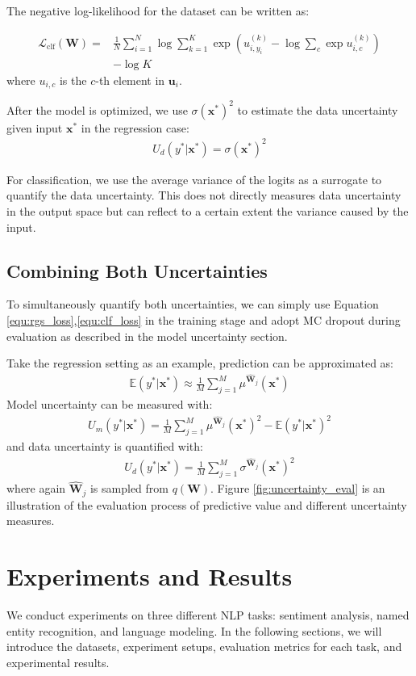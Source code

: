 \documentclass[letterpaper]{article} %
\newcommand{\vect}[1]{\mathbf{#1}}
\newcommand{\matr}[1]{\mathbf{#1}}
\newcommand{\vu}[0]{\vect{u}}
\newcommand{\vx}[0]{\vect{x}}
\newcommand{\vlb}{\mathcal{L}}
\newcommand{\E}{\mathbb{E}}
\newcommand{\mW}[0]{\matr{W}}
\begin{document}
The negative log-likelihood for the dataset can be written as:

\begin{align}
\label{equ:clf_loss}
\vlb_{\text{clf}}(\mW)= &\frac{1}{N}\sum_{i=1}^N\log\sum_{k=1}^K\exp\left(u_{i,y_i}^{(k)}-\log\sum_c\exp{u_{i,c}^{(k)}}\right) \nonumber\\
 & - \log{K}
\end{align}
where $u_{i,c}$ is the $c$-th element in $\vu_i$.

After the model is optimized, we use $\sigma(\vx^*)^2$ to estimate the data uncertainty given input $\vx^*$ in the regression case:
\begin{align}
U_d(y^*|\vx^*)=\sigma(\vx^*)^2
\end{align}

For classification, we use the average variance of the logits as a surrogate to quantify the data uncertainty. This does not directly measures data uncertainty in the output space but can reflect to a certain extent the variance caused by the input.

\subsection{Combining Both Uncertainties}
To simultaneously quantify both uncertainties, we can simply use Equation \ref{equ:rgs_loss},\ref{equ:clf_loss} in the training stage and adopt MC dropout during evaluation as described in the model uncertainty section.

Take the regression setting as an example, prediction can be approximated as:
\begin{align}
\E(y^*|\vx^*)\approx\frac{1}{M}\sum_{j=1}^M\mu^{\widehat{\mW}_j}(\vx^*)
\end{align}
Model uncertainty can be measured with:
\begin{align}
U_m(y^*|\vx^*)=\frac{1}{M}\sum_{j=1}^M\mu^{\widehat{\mW}_j}(\vx^*)^2-\E(y^*|\vx^*)^2
\end{align}
and data uncertainty is quantified with:
\begin{align}
\label{equ:ui}
U_d(y^*|\vx^*)=\frac{1}{M}\sum_{j=1}^M\sigma^{\widehat{\mW}_j}(\vx^*)^2
\end{align}
where again $\widehat{\mW}_j$ is sampled from $q(\mW)$. Figure \ref{fig:uncertainty_eval} is an illustration of the evaluation process of predictive value and different uncertainty measures.

\section{Experiments and Results}
We conduct experiments on three different NLP tasks: sentiment analysis, named entity recognition, and language modeling. In the following sections, we will introduce the datasets, experiment setups, evaluation metrics for each task, and experimental results.
\end{document}
